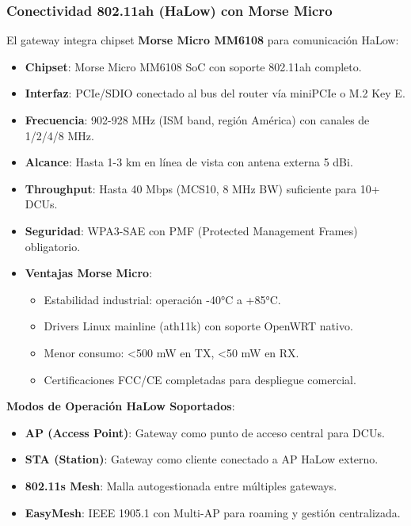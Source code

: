 \subsubsection{Conectividad 802.11ah (HaLow) con Morse Micro}

El gateway integra chipset \textbf{Morse Micro MM6108} para comunicación HaLow:

\begin{itemize}
    \item \textbf{Chipset}: Morse Micro MM6108 SoC con soporte 802.11ah completo.
    \item \textbf{Interfaz}: PCIe/SDIO conectado al bus del router vía miniPCIe o M.2 Key E.
    \item \textbf{Frecuencia}: 902-928 MHz (ISM band, región América) con canales de 1/2/4/8 MHz.
    \item \textbf{Alcance}: Hasta 1-3 km en línea de vista con antena externa 5 dBi.
    \item \textbf{Throughput}: Hasta 40 Mbps (MCS10, 8 MHz BW) suficiente para 10+ DCUs.
    \item \textbf{Seguridad}: WPA3-SAE con PMF (Protected Management Frames) obligatorio.
    \item \textbf{Ventajas Morse Micro}:
    \begin{itemize}
        \item Estabilidad industrial: operación -40°C a +85°C.
        \item Drivers Linux mainline (ath11k) con soporte OpenWRT nativo.
        \item Menor consumo: <500 mW en TX, <50 mW en RX.
        \item Certificaciones FCC/CE completadas para despliegue comercial.
    \end{itemize}
\end{itemize}

\textbf{Modos de Operación HaLow Soportados}:

\begin{itemize}
    \item \textbf{AP (Access Point)}: Gateway como punto de acceso central para DCUs.
    \item \textbf{STA (Station)}: Gateway como cliente conectado a AP HaLow externo.
    \item \textbf{802.11s Mesh}: Malla autogestionada entre múltiples gateways.
    \item \textbf{EasyMesh}: IEEE 1905.1 con Multi-AP para roaming y gestión centralizada.
\end{itemize}

